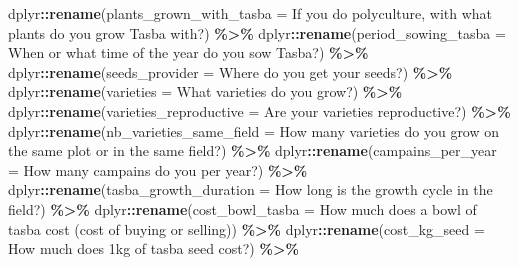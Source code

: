 \documentclass[
]{book}
\newenvironment{Shaded}{\begin{snugshade}}{\end{snugshade}}
\newcommand{\AttributeTok}[1]{\textcolor[rgb]{0.13,0.29,0.53}{#1}}
\newcommand{\FunctionTok}[1]{\textcolor[rgb]{0.13,0.29,0.53}{\textbf{#1}}}
\newcommand{\NormalTok}[1]{#1}
\newcommand{\SpecialCharTok}[1]{\textcolor[rgb]{0.81,0.36,0.00}{\textbf{#1}}}
\newcommand{\StringTok}[1]{\textcolor[rgb]{0.31,0.60,0.02}{#1}}
\begin{document}
\begin{Shaded}
\begin{Highlighting}[]
\NormalTok{  dplyr}\SpecialCharTok{::}\FunctionTok{rename}\NormalTok{(}\AttributeTok{plants\_grown\_with\_tasba =} \StringTok{\textasciigrave{}}\AttributeTok{If you do polyculture, with what plants do you grow Tasba with?}\StringTok{\textasciigrave{}}\NormalTok{) }\SpecialCharTok{\%\textgreater{}\%}
\NormalTok{  dplyr}\SpecialCharTok{::}\FunctionTok{rename}\NormalTok{(}\AttributeTok{period\_sowing\_tasba =} \StringTok{\textasciigrave{}}\AttributeTok{When or what time of the year do you sow Tasba?}\StringTok{\textasciigrave{}}\NormalTok{) }\SpecialCharTok{\%\textgreater{}\%}
\NormalTok{  dplyr}\SpecialCharTok{::}\FunctionTok{rename}\NormalTok{(}\AttributeTok{seeds\_provider =} \StringTok{\textasciigrave{}}\AttributeTok{Where do you get your seeds?}\StringTok{\textasciigrave{}}\NormalTok{) }\SpecialCharTok{\%\textgreater{}\%}
\NormalTok{  dplyr}\SpecialCharTok{::}\FunctionTok{rename}\NormalTok{(}\AttributeTok{varieties =} \StringTok{\textasciigrave{}}\AttributeTok{What varieties do you grow?}\StringTok{\textasciigrave{}}\NormalTok{) }\SpecialCharTok{\%\textgreater{}\%}
\NormalTok{  dplyr}\SpecialCharTok{::}\FunctionTok{rename}\NormalTok{(}\AttributeTok{varieties\_reproductive =} \StringTok{\textasciigrave{}}\AttributeTok{Are your varieties reproductive?}\StringTok{\textasciigrave{}}\NormalTok{) }\SpecialCharTok{\%\textgreater{}\%}
\NormalTok{  dplyr}\SpecialCharTok{::}\FunctionTok{rename}\NormalTok{(}\AttributeTok{nb\_varieties\_same\_field =} \StringTok{\textasciigrave{}}\AttributeTok{How many varieties do you grow on the same plot or in the same field?}\StringTok{\textasciigrave{}}\NormalTok{) }\SpecialCharTok{\%\textgreater{}\%}
\NormalTok{  dplyr}\SpecialCharTok{::}\FunctionTok{rename}\NormalTok{(}\AttributeTok{campains\_per\_year =} \StringTok{\textasciigrave{}}\AttributeTok{How many campains do you per year?}\StringTok{\textasciigrave{}}\NormalTok{) }\SpecialCharTok{\%\textgreater{}\%}
\NormalTok{  dplyr}\SpecialCharTok{::}\FunctionTok{rename}\NormalTok{(}\AttributeTok{tasba\_growth\_duration =} \StringTok{\textasciigrave{}}\AttributeTok{How long is the growth cycle in the field?}\StringTok{\textasciigrave{}}\NormalTok{) }\SpecialCharTok{\%\textgreater{}\%}
\NormalTok{  dplyr}\SpecialCharTok{::}\FunctionTok{rename}\NormalTok{(}\AttributeTok{cost\_bowl\_tasba =} \StringTok{\textasciigrave{}}\AttributeTok{How much does a bowl of tasba cost (cost of buying or selling)}\StringTok{\textasciigrave{}}\NormalTok{) }\SpecialCharTok{\%\textgreater{}\%}
\NormalTok{  dplyr}\SpecialCharTok{::}\FunctionTok{rename}\NormalTok{(}\AttributeTok{cost\_kg\_seed =} \StringTok{\textasciigrave{}}\AttributeTok{How much does 1kg of tasba seed cost?}\StringTok{\textasciigrave{}}\NormalTok{) }\SpecialCharTok{\%\textgreater{}\%}

\end{Highlighting}
\end{Shaded}
\end{document}
